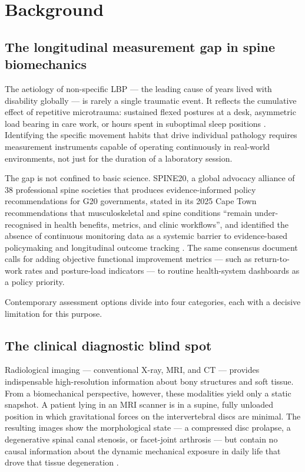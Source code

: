 \section{Background}

\subsection{The longitudinal measurement gap in spine biomechanics}

The aetiology of non-specific \ac{LBP} --- the leading cause of years lived
with disability globally \cite{hartvigsen2018} --- is rarely a single traumatic event.
It reflects the cumulative effect of repetitive microtrauma: sustained flexed postures at
a desk, asymmetric load bearing in care work, or hours spent in suboptimal sleep
positions \cite{burdorf1997}.
Identifying the specific movement habits that drive individual pathology requires
measurement instruments capable of operating continuously in real-world environments,
not just for the duration of a laboratory session.

The gap is not confined to basic science.
SPINE20, a global advocacy alliance of 38 professional spine societies that produces
evidence-informed policy recommendations for G20 governments, stated in its 2025
Cape Town recommendations that musculoskeletal and spine conditions ``remain
under-recognised in health benefits, metrics, and clinic workflows'', and identified
the absence of continuous monitoring data as a systemic barrier to evidence-based
policymaking and longitudinal outcome tracking \cite{spine20_2025}.
The same consensus document calls for adding objective functional improvement
metrics --- such as return-to-work rates and posture-load indicators --- to routine
health-system dashboards as a policy priority.

Contemporary assessment options divide into four categories, each with a decisive
limitation for this purpose.

\subsection{The clinical diagnostic blind spot}

Radiological imaging --- conventional X-ray, \ac{MRI}, and \ac{CT} --- provides
indispensable high-resolution information about bony structures and soft tissue.
From a biomechanical perspective, however, these modalities yield only a static
snapshot.
A patient lying in an MRI scanner is in a supine, fully unloaded position in which
gravitational forces on the intervertebral discs are minimal.
The resulting images show the morphological state --- a compressed disc prolapse,
a degenerative spinal canal stenosis, or facet-joint arthrosis --- but contain no
causal information about the dynamic mechanical exposure in daily life that drove
that tissue degeneration \cite{natarajan2023}.

